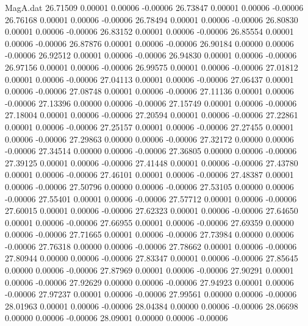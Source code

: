 \begin{filecontents}{MagA.dat}
  26.71509    0.00001    0.00006   -0.00006
  26.73847    0.00001    0.00006   -0.00006
  26.76168    0.00001    0.00006   -0.00006
  26.78494    0.00001    0.00006   -0.00006
  26.80830    0.00001    0.00006   -0.00006
  26.83152    0.00001    0.00006   -0.00006
  26.85554    0.00001    0.00006   -0.00006
  26.87876    0.00001    0.00006   -0.00006
  26.90184    0.00000    0.00006   -0.00006
  26.92512    0.00001    0.00006   -0.00006
  26.94830    0.00001    0.00006   -0.00006
  26.97156    0.00001    0.00006   -0.00006
  26.99575    0.00001    0.00006   -0.00006
  27.01812    0.00001    0.00006   -0.00006
  27.04113    0.00001    0.00006   -0.00006
  27.06437    0.00001    0.00006   -0.00006
  27.08748    0.00001    0.00006   -0.00006
  27.11136    0.00001    0.00006   -0.00006
  27.13396    0.00000    0.00006   -0.00006
  27.15749    0.00001    0.00006   -0.00006
  27.18004    0.00001    0.00006   -0.00006
  27.20594    0.00001    0.00006   -0.00006
  27.22861    0.00001    0.00006   -0.00006
  27.25157    0.00001    0.00006   -0.00006
  27.27455    0.00001    0.00006   -0.00006
  27.29863    0.00000    0.00006   -0.00006
  27.32172    0.00000    0.00006   -0.00006
  27.34514    0.00000    0.00006   -0.00006
  27.36805    0.00000    0.00006   -0.00006
  27.39125    0.00001    0.00006   -0.00006
  27.41448    0.00001    0.00006   -0.00006
  27.43780    0.00001    0.00006   -0.00006
  27.46101    0.00001    0.00006   -0.00006
  27.48387    0.00001    0.00006   -0.00006
  27.50796    0.00000    0.00006   -0.00006
  27.53105    0.00000    0.00006   -0.00006
  27.55401    0.00001    0.00006   -0.00006
  27.57712    0.00001    0.00006   -0.00006
  27.60015    0.00001    0.00006   -0.00006
  27.62323    0.00001    0.00006   -0.00006
  27.64650    0.00001    0.00006   -0.00006
  27.66955    0.00001    0.00006   -0.00006
  27.69359    0.00000    0.00006   -0.00006
  27.71665    0.00001    0.00006   -0.00006
  27.73984    0.00000    0.00006   -0.00006
  27.76318    0.00000    0.00006   -0.00006
  27.78662    0.00001    0.00006   -0.00006
  27.80944    0.00000    0.00006   -0.00006
  27.83347    0.00001    0.00006   -0.00006
  27.85645    0.00000    0.00006   -0.00006
  27.87969    0.00001    0.00006   -0.00006
  27.90291    0.00001    0.00006   -0.00006
  27.92629    0.00000    0.00006   -0.00006
  27.94923    0.00001    0.00006   -0.00006
  27.97237    0.00001    0.00006   -0.00006
  27.99561    0.00000    0.00006   -0.00006
  28.01963    0.00001    0.00006   -0.00006
  28.04384    0.00000    0.00006   -0.00006
  28.06698    0.00000    0.00006   -0.00006
  28.09001    0.00000    0.00006   -0.00006

\end{filecontents}
